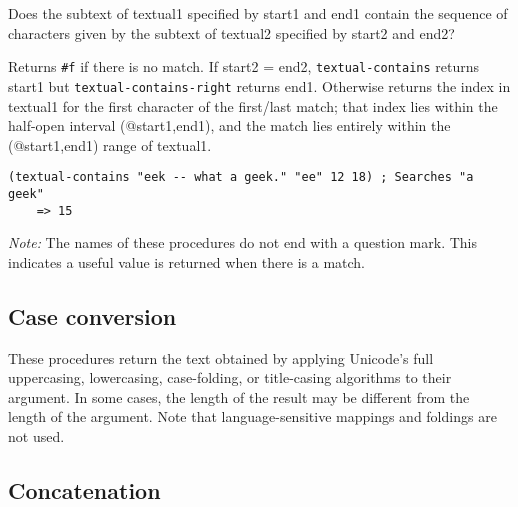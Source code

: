 \begin{entry}{%
  }
  
  Does the subtext of textual1 specified by start1 and end1 contain
  the sequence of characters given by the subtext of textual2
  specified by start2 and end2?

  Returns \texttt{\#f} if there is no match. If start2 = end2,
  \texttt{textual-contains} returns start1 but
  \texttt{textual-contains-right} returns end1. Otherwise returns the
  index in textual1 for the first character of the first/last match;
  that index lies within the half-open interval (@start1,end1), and
  the match lies entirely within the (@start1,end1) range of textual1.

\begin{verbatim}
(textual-contains "eek -- what a geek." "ee" 12 18) ; Searches "a geek"
    => 15
\end{verbatim}

  \emph{Note:} The names of these procedures do not end with a
  question mark. This indicates a useful value is returned when there
  is a match.
\end{entry}

\subsection{{Case conversion}}\label{case-conversion}

\begin{entry}{%
  }

  These procedures
  return the text obtained by applying Unicode's full uppercasing,
  lowercasing, case-folding, or title-casing algorithms to their
  argument. In some cases, the length of the result may be different
  from the length of the argument. Note that language-sensitive
  mappings and foldings are not used.
\end{entry}

\subsection{{Concatenation}}\label{concatenation}

